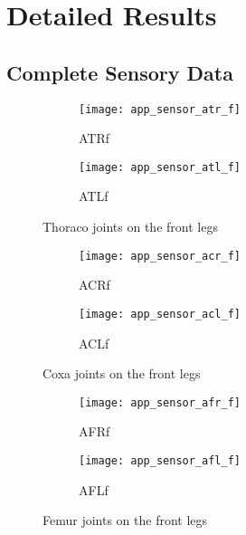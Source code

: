 \chapter{Detailed Results} \label{app:detailed_results}

\section{Complete Sensory Data} \label{sec:complete_sensory_data}

\begin{figure}[H]
\centering
\begin{subfigure}{0.48\textwidth}
  \centering
  \texttt{[image: app\_sensor\_atr\_f]}
  \caption{ATRf}
  \label{fig:app_atr_f}
\end{subfigure}
\begin{subfigure}{0.48\textwidth}
  \centering
  \texttt{[image: app\_sensor\_atl\_f]}
  \caption{ATLf}
  \label{fig:app_atl_f}
\end{subfigure}
\caption{Thoraco joints on the front legs}
\label{fig:app_at_f}
\end{figure}

\begin{figure}[H]
\centering
\begin{subfigure}{0.48\textwidth}
  \centering
  \texttt{[image: app\_sensor\_acr\_f]}
  \caption{ACRf}
  \label{fig:app_acr_f}
\end{subfigure}
\begin{subfigure}{0.48\textwidth}
  \centering
  \texttt{[image: app\_sensor\_acl\_f]}
  \caption{ACLf}
  \label{fig:app_acl_f}
\end{subfigure}
\caption{Coxa joints on the front legs}
\label{fig:app_ac_f}
\end{figure}

\begin{figure}[H]
\centering
\begin{subfigure}{0.48\textwidth}
  \centering
  \texttt{[image: app\_sensor\_afr\_f]}
  \caption{AFRf}
  \label{fig:app_afr_f}
\end{subfigure}
\begin{subfigure}{0.48\textwidth}
  \centering
  \texttt{[image: app\_sensor\_afl\_f]}
  \caption{AFLf}
  \label{fig:app_afl_f}
\end{subfigure}
\caption{Femur joints on the front legs}
\label{fig:app_af_f}
\end{figure}

